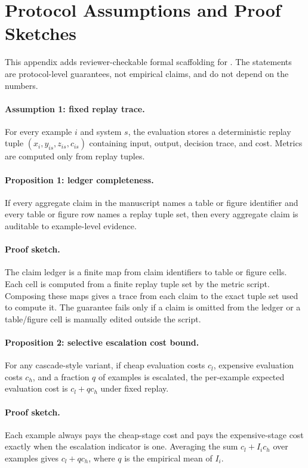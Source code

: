 \section{Protocol Assumptions and Proof Sketches}
This appendix adds reviewer-checkable formal scaffolding for \method{}. The statements are protocol-level guarantees, not empirical claims, and do not depend on the \syntheticlabel{} numbers.

\paragraph{Assumption 1: fixed replay trace.} For every example $i$ and system $s$, the evaluation stores a deterministic replay tuple $(x_i, y_{is}, z_{is}, c_{is})$ containing input, output, decision trace, and cost. Metrics are computed only from replay tuples.

\paragraph{Proposition 1: ledger completeness.} If every aggregate claim in the manuscript names a table or figure identifier and every table or figure row names a replay tuple set, then every aggregate claim is auditable to example-level evidence.

\paragraph{Proof sketch.} The claim ledger is a finite map from claim identifiers to table or figure cells. Each cell is computed from a finite replay tuple set by the metric script. Composing these maps gives a trace from each claim to the exact tuple set used to compute it. The guarantee fails only if a claim is omitted from the ledger or a table/figure cell is manually edited outside the script.

\paragraph{Proposition 2: selective escalation cost bound.} For any cascade-style variant, if cheap evaluation costs $c_l$, expensive evaluation costs $c_h$, and a fraction $q$ of examples is escalated, the per-example expected evaluation cost is $c_l + q c_h$ under fixed replay.

\paragraph{Proof sketch.} Each example always pays the cheap-stage cost and pays the expensive-stage cost exactly when the escalation indicator is one. Averaging the sum $c_l + I_i c_h$ over examples gives $c_l + q c_h$, where $q$ is the empirical mean of $I_i$.

